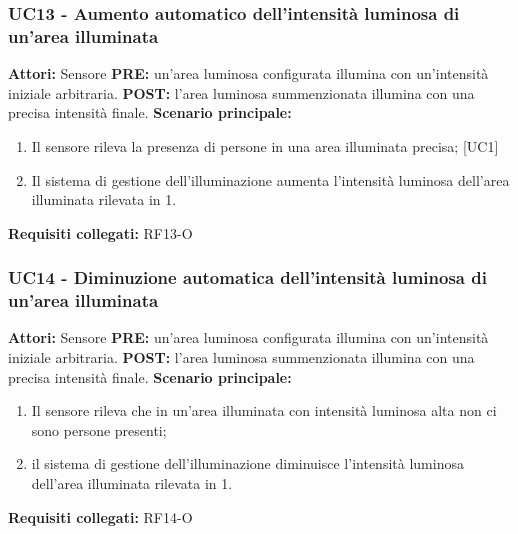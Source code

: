 \documentclass[a4paper, 12pt]{article}
\begin{document}
\subsubsection{UC13 - Aumento automatico dell'intensità luminosa di un'area illuminata}
\textbf{Attori:} Sensore \newline
\textbf{PRE:} un'area luminosa configurata illumina con un'intensità iniziale arbitraria.\newline
\textbf{POST:} l'area luminosa summenzionata illumina con una precisa intensità finale.\newline
\textbf{Scenario principale:}
\begin{enumerate}
    \item Il sensore rileva la presenza di persone in una area illuminata precisa; [UC1]
    \item Il sistema di gestione dell'illuminazione aumenta l'intensità luminosa dell'area illuminata rilevata in 1.
\end{enumerate}
\textbf{Requisiti collegati:} RF13-O\newline

\subsubsection{UC14 - Diminuzione automatica dell'intensità luminosa di un'area illuminata}
\textbf{Attori:} Sensore \newline
\textbf{PRE:} un'area luminosa configurata illumina con un'intensità iniziale arbitraria.\newline
\textbf{POST:} l'area luminosa summenzionata illumina con una precisa intensità finale.\newline
\textbf{Scenario principale:}
\begin{enumerate}
    \item Il sensore rileva che in un'area illuminata con intensità luminosa alta non ci sono persone presenti;
    \item il sistema di gestione dell'illuminazione diminuisce l'intensità luminosa dell'area illuminata rilevata in 1.
\end{enumerate}
\textbf{Requisiti collegati:} RF14-O\newline
\end{document}
